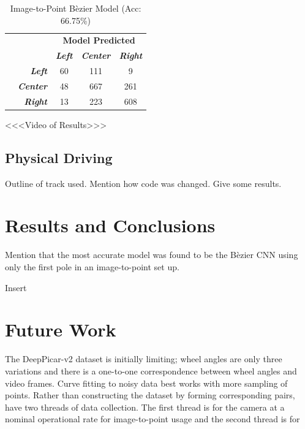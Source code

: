 \documentclass[conference]{IEEEtran}
\begin{document}
	    \begin{table}[tbp]
        \centering
            \caption{Image-to-Point B\`ezier Model (Acc: 66.75\%)}
            \begin{tabular}{|c|r|c|c|c|}
            \multicolumn{2}{c}{} & \multicolumn{3}{c}{\bfseries Model Predicted}\\\cline{3-5}
            \multicolumn{1}{c}{} & & \textbf{\textit{Left}} & \textbf{\textit{Center}} & \textbf{\textit{Right}}\\\hline
             \parbox[t]{2mm}{} & \textbf{\textit{Left}} & 60 & 111 & 9 \\
            & \textbf{\textit{Center}} & 48 & 667 & 261 \\
            & \textbf{\textit{Right}} & 13 & 223 & 608 \\\hline
            \end{tabular}
        \label{tab:i2bp-acc}
    \end{table}

<<<Video of Results>>>

\subsection{Physical Driving}

Outline of track used.
Mention how code was changed.
Give some results. 

\section{Results and Conclusions}

Mention that the most accurate model was found to be the B\`ezier CNN using only the first pole in an image-to-point set up.

Insert 

\section{Future Work}

The DeepPicar-v2 dataset is initially limiting; wheel angles are only three variations and there is a one-to-one correspondence between wheel angles and video frames. Curve fitting to noisy data best works with more sampling of points. Rather than constructing the dataset by forming corresponding pairs, have two threads of data collection. The first thread is for the camera at a nominal operational rate for image-to-point usage and the second thread is for 



\end{document}
